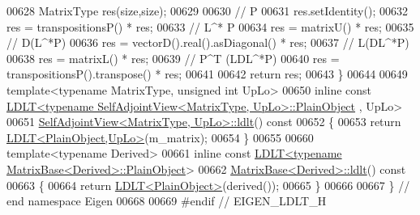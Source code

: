 \begin{DoxyCode}
00628   MatrixType res(size,size);
00629 
00630   \textcolor{comment}{// P}
00631   res.setIdentity();
00632   res = transpositionsP() * res;
00633   \textcolor{comment}{// L^* P}
00634   res = matrixU() * res;
00635   \textcolor{comment}{// D(L^*P)}
00636   res = vectorD().real().asDiagonal() * res;
00637   \textcolor{comment}{// L(DL^*P)}
00638   res = matrixL() * res;
00639   \textcolor{comment}{// P^T (LDL^*P)}
00640   res = transpositionsP().transpose() * res;
00641 
00642   \textcolor{keywordflow}{return} res;
00643 \}
00644 
00649 \textcolor{keyword}{template}<\textcolor{keyword}{typename} MatrixType, \textcolor{keywordtype}{unsigned} \textcolor{keywordtype}{int} UpLo>
00650 \textcolor{keyword}{inline} \textcolor{keyword}{const} \hyperlink{group___cholesky___module_class_eigen_1_1_l_d_l_t}{LDLT<typename SelfAdjointView<MatrixType, UpLo>::PlainObject}
      , UpLo>
00651 \hyperlink{group___core___module_a644155eef17b37c95d85b9f65bb49ac4}{SelfAdjointView<MatrixType, UpLo>::ldlt}()\textcolor{keyword}{ const}
00652 \textcolor{keyword}{}\{
00653   \textcolor{keywordflow}{return} \hyperlink{group___cholesky___module_class_eigen_1_1_l_d_l_t}{LDLT<PlainObject,UpLo>}(m\_matrix);
00654 \}
00655 
00660 \textcolor{keyword}{template}<\textcolor{keyword}{typename} Derived>
00661 \textcolor{keyword}{inline} \textcolor{keyword}{const} \hyperlink{group___cholesky___module_class_eigen_1_1_l_d_l_t}{LDLT<typename MatrixBase<Derived>::PlainObject}>
00662 \hyperlink{group___core___module_a0ecf058a0727a4cab8b42d79e95072e1}{MatrixBase<Derived>::ldlt}()\textcolor{keyword}{ const}
00663 \textcolor{keyword}{}\{
00664   \textcolor{keywordflow}{return} \hyperlink{group___cholesky___module_class_eigen_1_1_l_d_l_t}{LDLT<PlainObject>}(derived());
00665 \}
00666 
00667 \} \textcolor{comment}{// end namespace Eigen}
00668 
00669 \textcolor{preprocessor}{#endif // EIGEN\_LDLT\_H}
\end{DoxyCode}
